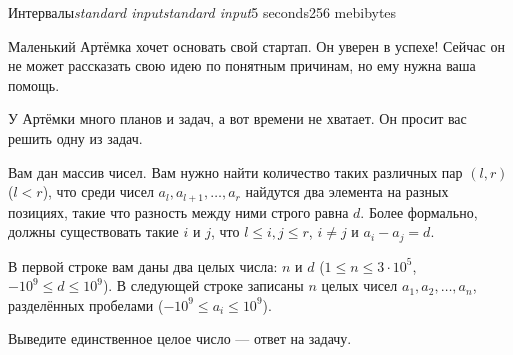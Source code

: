 \begin{problem}{Интервалы}{\textsl{standard input}}{\textsl{standard input}}{5 seconds}{256 mebibytes}{}

Маленький Артёмка хочет основать свой стартап. Он уверен в успехе! Сейчас он не может рассказать свою идею по понятным причинам, но ему нужна ваша помощь.

У Артёмки много планов и задач, а вот времени не хватает. Он просит вас решить одну из задач.

Вам дан массив чисел. Вам нужно найти количество таких различных пар $(l, r)$ ($l < r$), что среди чисел $a_l, a_{l+1}, \ldots, a_r$ найдутся два элемента на разных позициях, такие что разность между ними строго равна $d$. Более формально, должны существовать такие $i$ и $j$, что $l \le i, j \le r$, $i \neq j$ и $a_i - a_j = d$.


\InputFile
В первой строке вам даны два целых числа: $n$ и $d$ ($1 \le n \le 3 \cdot 10^5$, $-10^9 \le d \le 10^9$). В следующей строке записаны $n$ целых чисел $a_1, a_2, \ldots, a_n$, разделённых пробелами ($-10^9 \le a_i \le 10^9$).

\OutputFile
Выведите единственное целое число --- ответ на задачу.

\Examples

\begin{example}
\end{example}

\end{problem}
